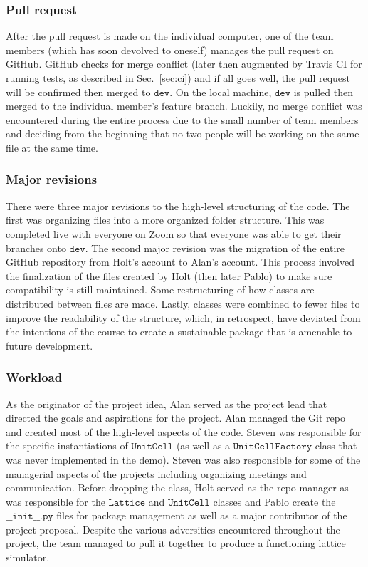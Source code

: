 \documentclass{article}
\begin{document}
\subsubsection{Pull request}
\label{sec:pr}
After the pull request is made on the individual computer, one of the team members (which has soon devolved to oneself) manages the pull request on GitHub.  GitHub checks for merge conflict (later then augmented by Travis CI for running tests, as described in Sec.~\ref{sec:ci}) and if all goes well, the pull request will be confirmed then merged to $\texttt{dev}$.  On the local machine, $\texttt{dev}$ is pulled then merged to the individual member's feature branch.  Luckily, no merge conflict was encountered during the entire process due to the small number of team members and deciding from the beginning that no two people will be working on the same file at the same time.

\subsubsection{Major revisions}
There were three major revisions to the high-level structuring of the code.  The first was organizing files into a more organized folder structure.  This was completed live with everyone on Zoom so that everyone was able to get their branches onto $\texttt{dev}$.  The second major revision was the migration of the entire GitHub repository from Holt's account to Alan's account.  This process involved the finalization of the files created by Holt (then later Pablo) to make sure compatibility is still maintained.  Some restructuring of how classes are distributed between files are made.  Lastly, classes were combined to fewer files to improve the readability of the structure, which, in retrospect, have deviated from the intentions of the course to create a sustainable package that is amenable to future development.

\subsubsection{Workload}
As the originator of the project idea, Alan served as the project lead that directed the goals and aspirations for the project.  Alan managed the Git repo and created most of the high-level aspects of the code.  Steven was responsible for the specific instantiations of $\texttt{UnitCell}$ (as well as a $\texttt{UnitCellFactory}$ class that was never implemented in the demo).  Steven was also responsible for some of the managerial aspects of the projects including organizing meetings and communication.  Before dropping the class, Holt served as the repo manager as was responsible for the $\texttt{Lattice}$ and $\texttt{UnitCell}$ classes and Pablo create the $\texttt{\_\_init\_\_.py}$ files for package management as well as a major contributor of the project proposal.  Despite the various adversities encountered throughout the project, the team managed to pull it together to produce a functioning lattice simulator.
\end{document}
